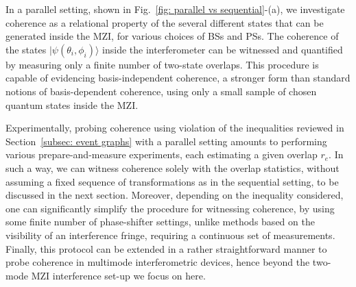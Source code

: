 \documentclass[a4paper,twocolumn,11pt,accepted=2024-01-17]{quantumarticle}
\begin{document}
In a parallel setting, shown in Fig.~\ref{fig: parallel vs sequential}-(a), we investigate coherence as a relational property of the several different states that can be generated inside the MZI, for various choices of BSs and PSs.
The coherence of the states $\vert \psi(\theta_i,\phi_i) \rangle $ inside the interferometer can be witnessed and quantified by measuring only a finite number of two-state overlaps. This procedure is capable of evidencing basis-independent coherence, a stronger form than standard notions of basis-dependent coherence, using only a small sample of chosen quantum states inside the MZI. 

{ Experimentally, probing coherence using violation of the inequalities reviewed in Section~\ref{subsec: event graphs} with a parallel setting amounts to performing various prepare-and-measure experiments, each estimating a given overlap $r_e$. In such a way, we can witness coherence solely with the overlap statistics, without assuming a fixed sequence of transformations as in the sequential setting, to be discussed in the next section. Moreover, depending on the inequality considered, one can significantly simplify the procedure for witnessing coherence, by using some finite number of phase-shifter settings, unlike methods based on the visibility of an interference fringe, requiring a continuous set of measurements. Finally, this protocol can be extended in a rather straightforward manner to probe coherence in multimode interferometric devices, hence beyond the two-mode MZI interference set-up we focus on here. %
}
\end{document}
